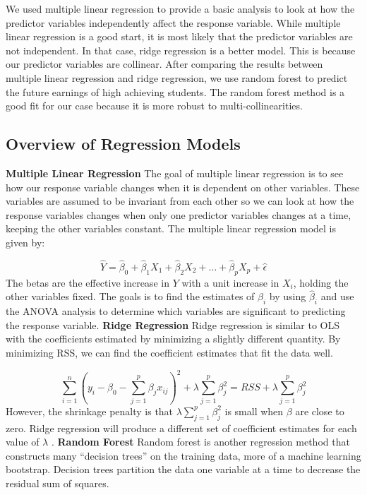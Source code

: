 \documentclass{article}
\begin{document}
  We used multiple linear regression to provide a basic analysis to look at how the predictor variables independently affect the response variable.  
While multiple linear regression is a good start, it is most likely that the predictor variables are not independent.  In that case, ridge regression is a better model.  This is because our predictor variables are collinear.  
After comparing the results between multiple linear regression and ridge regression, we use random forest to predict the future earnings of high achieving students.  The random forest method is a good fit for our case because it is more robust to multi-collinearities. 


\subsection{Overview of Regression Models}

\noindent \textbf{Multiple Linear Regression} \newline
\indent The goal of multiple linear regression is to see how our response variable changes when it is dependent on other variables.  These variables are assumed to be invariant from each other so we can look at how the response variables changes when only one predictor variables changes at a time, keeping the other variables constant.  The multiple linear regression model is given by:

$$\hat Y = \hat \beta_0 + \hat \beta_1 X_1 + \hat \beta_2 X_2 + \dots + \hat \beta_p X_p + \hat \epsilon$$
The betas are the effective increase in $Y$ with a unit increase in $X_i$, holding the other variables fixed.  
The goals is to find the estimates of $\beta_i$ by using $\hat \beta_i$ and use the ANOVA analysis to determine which variables are significant to predicting the response variable.
\newline
\newline
\textbf{Ridge Regression}\newline
\indent Ridge regression is similar to OLS with the coefficients estimated by minimizing a slightly different quantity.  By minimizing RSS, we can find the coefficient estimates that fit the data well. 

$$\sum_{i=1}^{n}(y_i-\beta_0-\sum_{j=1}^{p}\beta_jx_{ij})^2+\lambda\sum_{j=1}^{p}\beta_j^2 = RSS + \lambda\sum_{j=1}^{p}\beta_j^{2}$$ 
However, the shrinkage penalty is that $\lambda\sum_{j=1}^{p}\beta_j^{2}$ is small when $\beta$ are close to zero. Ridge regression will produce a different set of coefficient estimates for each value of $\lambda$ .
\newline
\newline
\textbf{Random Forest}\newline
\indent Random forest is another regression method that constructs many ``decision trees'' on the training data, more of a machine learning bootstrap.  Decision trees partition the data one variable at a time to decrease the residual sum of squares. 
\end{document}
